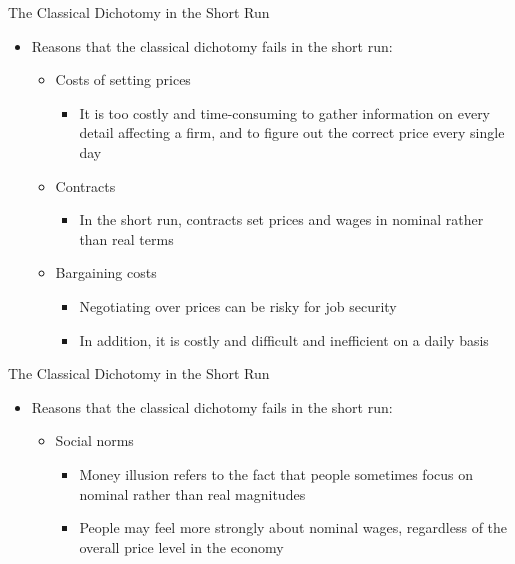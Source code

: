 \documentclass[aspectratio=1610]{beamer}
\begin{document}
\begin{frame}[wide]{The Classical Dichotomy in the Short Run}
	\begin{itemize}
		\item Reasons that the classical dichotomy fails in the short run:
		\vspace{2mm}
		\begin{itemize}
			\item Costs of setting prices
			\begin{itemize}
				\item It is too costly and time-consuming to gather information on every detail affecting a firm, and to figure out the correct price every single day
			\end{itemize}
			\item Contracts
			\begin{itemize}
				\item In the short run, contracts set prices and wages in nominal rather than real terms
			\end{itemize}
			\item Bargaining costs
			\begin{itemize}
				\item Negotiating over prices can be risky for job security
				\item In addition, it is costly and difficult and inefficient on a daily basis
			\end{itemize} 
		\end{itemize}
	\end{itemize}
\end{frame}

\begin{frame}[wide]{The Classical Dichotomy in the Short Run}
	\begin{itemize}
		\item Reasons that the classical dichotomy fails in the short run:
		\vspace{2mm}
		\begin{itemize}
			\item Social norms
			\vspace{2mm}
			\begin{itemize}
				\item Money illusion refers to the fact that people sometimes focus on nominal rather than real magnitudes
				\item People may feel more strongly about nominal wages, regardless of the overall price level in the economy
			\end{itemize}
		\end{itemize}
	\end{itemize}
\end{frame}
\end{document}
